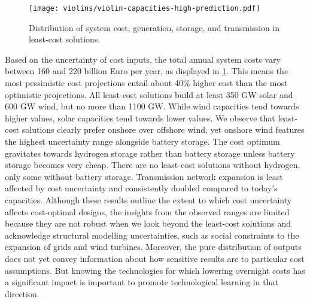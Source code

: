 
\begin{figure}
    \centering
    \texttt{[image: violins/violin-capacities-high-prediction.pdf]}
    \caption{
      Distribution of system cost, generation, storage, and transmission
      in least-cost solutions.
    }
    \label{fig:violin}
\end{figure}

Based on the uncertainty of cost inputs, the total annual system costs vary
between 160 and 220 billion Euro per year, as displayed in \cref{fig:violin}.
This means the most pessimistic cost projections entail about 40\% higher cost
than the most optimistic projections. All least-cost solutions build at least
350 GW solar and 600 GW wind, but no more than 1100 GW. While wind capacities
tend towards higher values, solar capacities tend towards lower values. We
observe that least-cost solutions clearly prefer onshore over offshore wind, yet
onshore wind features the highest uncertainty range alongside battery storage.
The cost optimum gravitates towards hydrogen storage rather than battery storage
unless battery storage becomes very cheap. There are no least-cost solutions
without hydrogen, only some without battery storage. Transmission network
expansion is least affected by cost uncertainty and consistently doubled
compared to today's capacities. Although these results outline the extent to
which cost uncertainty affects cost-optimal designs, the insights from the
observed ranges are limited because they are not robust when we look beyond the
least-cost solutions and acknowledge structural modelling uncertainties, such as
social constraints to the expansion of grids and wind turbines. Moreover, the
pure distribution of outputs does not yet convey information about how sensitive
results are to particular cost assumptions. But knowing the technologies for
which lowering overnight costs has a significant impact is important to promote
technological learning in that direction.

